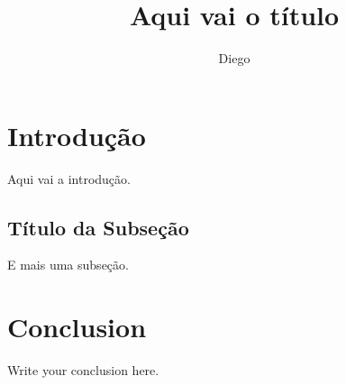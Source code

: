 \documentclass[a4paper,12pt]{report}
\begin{document}
\title{Aqui vai o título}
\author{Diego}

\maketitle
\tableofcontents


\section{Introdução}
Aqui vai a introdução.

\subsection{Título da Subseção}
E mais uma subseção.


\section{Conclusion}
Write your conclusion here.
\end{document}
